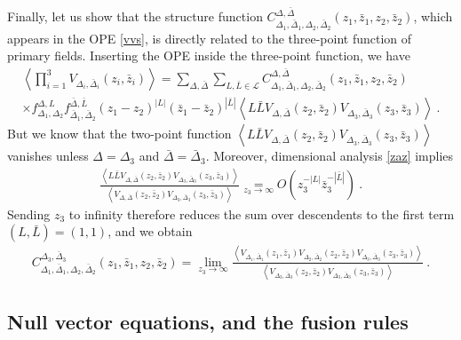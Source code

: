 \documentclass[12pt,a4paper,notitlepage]{report}
\numberwithin{equation}{section}
\theoremstyle{break}
\begin{document}
Finally, let us show that the structure function $C_{\Delta_1,\bar{\Delta}_1,\Delta_2,\bar{\Delta}_2}^{\Delta,\bar{\Delta}}(z_1,\bar{z}_1,z_2,\bar{z}_2)$, which appears in the OPE \eqref{vvs}, is directly related to the three-point function of primary fields.
Inserting the OPE inside the three-point function, we have 
\begin{multline}
 \left\langle \prod_{i=1}^3 V_{\Delta_i,\bar{\Delta}_i}(z_i,\bar{z}_i) \right\rangle = \sum_{\Delta,\bar{\Delta}}\sum_{L,\bar{L}\in \mathcal{L}} 
 C_{\Delta_1,\bar{\Delta}_1,\Delta_2,\bar{\Delta}_2}^{\Delta,\bar{\Delta}}(z_1,\bar{z}_1,z_2,\bar{z}_2)
\\ \times
 f_{\Delta_1,\Delta_2}^{\Delta,L} f_{\bar{\Delta}_1,\bar{\Delta}_2}^{\bar{\Delta},\bar{L}} (z_1-z_2)^{|L|} (\bar{z}_1-\bar{z}_2)^{|\bar{L}|}
 \left\langle L\bar{L} V_{\Delta,\bar{\Delta}}(z_2,\bar{z}_2) V_{\Delta_3,\bar{\Delta}_3}(z_3,\bar{z}_3)\right\rangle\ .
\end{multline}
But we know that the two-point function $\left\langle L\bar{L} V_{\Delta,\bar{\Delta}}(z_2,\bar{z}_2) V_{\Delta_3,\bar{\Delta}_3}(z_3,\bar{z}_3)\right\rangle$ vanishes unless $\Delta=\Delta_3$ and $\bar{\Delta}=\bar{\Delta}_3$.
Moreover, dimensional analysis \eqref{zaz} implies 
\begin{align}
 \frac{\left\langle L\bar{L} V_{\Delta,\bar{\Delta}}(z_2,\bar{z}_2) V_{\Delta_3,\bar{\Delta}_3}(z_3,\bar{z}_3)\right\rangle }{\left\langle V_{\Delta,\bar{\Delta}}(z_2,\bar{z}_2) V_{\Delta_3,\bar{\Delta}_3}(z_3,\bar{z}_3)\right\rangle } \underset{z_3\rightarrow \infty}{=} O\left(z_3^{-|L|}\bar{z}_3^{-|\bar{L}|}\right)\ .
\end{align}
Sending $z_3$ to infinity therefore reduces the sum over descendents to the first term $(L,\bar{L})=(1,1)$, and we obtain
\begin{align}
C_{\Delta_1,\bar{\Delta}_1,\Delta_2,\bar{\Delta}_2}^{\Delta_3,\bar{\Delta}_3}(z_1,\bar{z}_1,z_2,\bar{z}_2) =\underset{z_3\rightarrow \infty}{\lim} \frac{\left\langle V_{\Delta_1,\bar{\Delta}_1}(z_1,\bar{z}_1) V_{\Delta_2,\bar{\Delta}_2}(z_2,\bar{z}_2)  V_{\Delta_3,\bar{\Delta}_3}(z_3,\bar{z}_3)\right\rangle}{\left\langle V_{\Delta_3,\bar{\Delta}_3}(z_2,\bar{z}_2)  V_{\Delta_3,\bar{\Delta}_3}(z_3,\bar{z}_3)\right\rangle}\ .
\label{cftt}
\end{align}


\subsection{Null vector equations, and the fusion rules}
\end{document}
